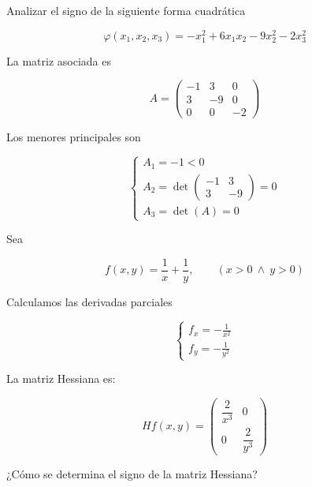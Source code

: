 \begin{Ejer}

Analizar el signo de la siguiente forma cuadrática

\[
\varphi(x_1,x_2,x_3)
= -x_1^2 + 6x_1x_2 - 9x_2^2 - 2x_3^2
\]

La matriz asociada es

\[
A=
\begin{pmatrix}
-1 & 3 & 0\\
3 & -9 & 0\\
0 & 0 & -2
\end{pmatrix}
\]



Los menores principales son

\[
\begin{cases}
A_1 = -1 < 0 \\
A_2 = \det
\begin{pmatrix}
-1 & 3\\
3 & -9
\end{pmatrix}
= 0 \\
A_3 = \det(A) = 0
\end{cases}
\]


\bigskip

Sea

\[
f(x,y)=\frac{1}{x}+\frac{1}{y},
\qquad (x>0 \ \wedge \ y>0)
\]

Calculamos las derivadas parciales

\[
\begin{cases}
f_x = -\frac{1}{x^2} \\
f_y = -\frac{1}{y^2}
\end{cases}
\]

La matriz Hessiana es:

\[
Hf(x,y)=
\begin{pmatrix}
\dfrac{2}{x^3} & 0 \\
0 & \dfrac{2}{y^3}
\end{pmatrix}
\]

¿C\'omo se determina el signo de la matriz Hessiana?
\end{Ejer}

